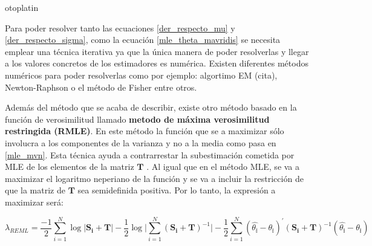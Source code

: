 otoplatin\documentclass[a4paper,openright,12pt]{report}
\begin{document}
Para poder resolver tanto las ecuaciones \ref{der_respecto_mu} y \ref{der_respecto_sigma}, como la ecuación \ref{mle_theta_mavridis} se necesita emplear una técnica iterativa ya que la única manera de poder resolverlas y llegar a los valores concretos de los estimadores es numérica. Existen diferentes métodos numéricos para poder resolverlas como por ejemplo: algortimo EM (cita), Newton-Raphson o el método de Fisher entre otros.

Además del método que se acaba de describir, existe otro método basado en la función de verosimilitud llamado \textbf{metodo de máxima verosimilitud restringida (RMLE)}. En este método la función que se a maximizar sólo involucra a los componentes de la varianza y no a la media como pasa en \ref{mle_mvn}. Esta técnica ayuda a contrarrestar la subestimación cometida por MLE de los elementos de la matriz $\mathbf{T}$ \cite{Jackson2011}. Al igual que en el método MLE, se va a maximizar el logaritmo neperiano de la función y se va a incluir la restricción de que la matriz de $\mathbf{T}$ sea semidefinida positiva. Por lo tanto, la expresión a maximizar será:

{\footnotesize \begin{equation}
\lambda_{REML}=\frac{-1}{2}\sum_{i=1}^{N}\log\vert\mathbf{S_{i}+T}\vert-\frac{1}{2}\log\vert\sum_{i=1}^{N}(\mathbf{S_{i}+T})^{-1}\vert-\frac{1}{2}\sum_{i=1}^{N}(\mathbb{\widehat{\theta_{i}}}-\mathbb{\theta_{i}})^{'}(\mathbf{S_{i}+T})^{-1}(\mathbb{\widehat{\theta_{i}}}-\mathbb{\theta_{i}})
\label{rmle_mvm}
\end{equation}}
\end{document}
